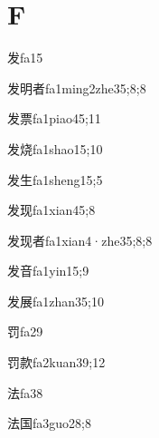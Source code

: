 \section*{F}

\begin{verbete}{发}{fa1}{5}
\end{verbete}
\begin{verbete}{发明者}{fa1ming2zhe3}{5;8;8}
\end{verbete}
\begin{verbete}{发票}{fa1piao4}{5;11}
\end{verbete}
\begin{verbete}{发烧}{fa1shao1}{5;10}
\end{verbete}
\begin{verbete}{发生}{fa1sheng1}{5;5}
\end{verbete}
\begin{verbete}{发现}{fa1xian4}{5;8}
\end{verbete}
\begin{verbete}{发现者}{fa1xian4·zhe3}{5;8;8}
\end{verbete}
\begin{verbete}{发音}{fa1yin1}{5;9}
\end{verbete}
\begin{verbete}{发展}{fa1zhan3}{5;10}
\end{verbete}
\begin{verbete}{罚}{fa2}{9}
\end{verbete}
\begin{verbete}{罚款}{fa2kuan3}{9;12}
\end{verbete}
\begin{verbete}{法}{fa3}{8}
\end{verbete}
\begin{verbete}{法国}{fa3guo2}{8;8}
\end{verbete}
